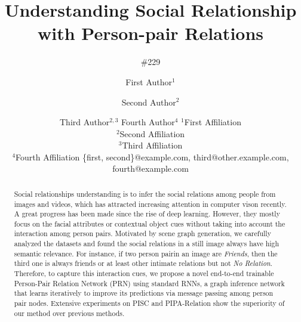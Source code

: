\documentclass{article}
\title{Understanding Social Relationship with Person-pair Relations}
\author{
    \#229
}
\author{
First Author$^1$
\and
Second Author$^2$\and
Third Author$^{2,3}$\And
Fourth Author$^4$
\affiliations
$^1$First Affiliation\\
$^2$Second Affiliation\\
$^3$Third Affiliation\\
$^4$Fourth Affiliation
\emails
\{first, second\}@example.com,
third@other.example.com,
fourth@example.com
}
\newcommand{\PRN}{{\sf PRN}}
\begin{document}
\maketitle

\begin{abstract}

Social relationships understanding is to infer the social relations among people from images and videos, which has attracted increasing attention in computer vison recently. A great progress has been made since the rise of deep learning. However, they mostly focus on the facial attributes or contextual object cues without taking into account the interaction among person pairs. Motivated by scene graph generation, we carefully analyzed the datasets and found the social relations in a still image always have high semantic relevance. For instance, if two person pairin an image are {\it Friends}, then the third one is always friends or at least other intimate relations but not {\it No Relation}. Therefore, to capture this interaction cues, we propose a novel end-to-end trainable Person-Pair Relation Network (\PRN) using standard RNNs, a graph inference network that learns iteratively to improve its predictions via message passing among person pair nodes. Extensive experiments on PISC and PIPA-Relation show the superiority of our method over previous methods. 

\end{abstract}
\end{document}
